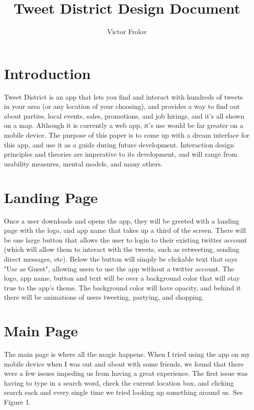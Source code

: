 \documentclass[11pt]{article}
\title{Tweet District Design Document}
\author{Victor Frolov}
\begin{document}
\maketitle

\section{Introduction}
Tweet District is an app that lets you find and interact with hundreds of tweets in your area (or any location of your choosing), and provides a way to find out about parties, local events, sales, promotions, and job hirings, and it's all shown on a map. Although it is currently a web app, it's use would be far greater on a mobile device. The purpose of this paper is to come up with a dream interface for this app, and use it as a guide during future development. Interaction design principles and theories are imperative to its development, and will range from usability measures, mental models, and many others.


\section{Landing Page}
Once a user downloads and opens the app, they will be greeted with a landing page with the logo, and app name that takes up a third of the screen. There will be one large button that allows the user to login to their existing twitter account (which will allow them to interact with the tweets, such as retweeting, sending direct messages, etc). Below the button will simply be clickable text that says "Use as Guest", allowing users to use the app without a twitter account. The logo, app name, button and text will be over a background color that will stay true to the app's theme. The background color will have opacity, and behind it there will be animations of users tweeting, partying, and shopping. 




\section{Main Page}
The main page is where all the magic happens. When I tried using the app on my mobile device when I was out and about with some friends, we found that there were a few issues impeding us from having a great experience. The first issue was having to type in a search word, check the current location box, and clicking search each and every single time we tried looking up something around us. See Figure 1.
\end{document}
